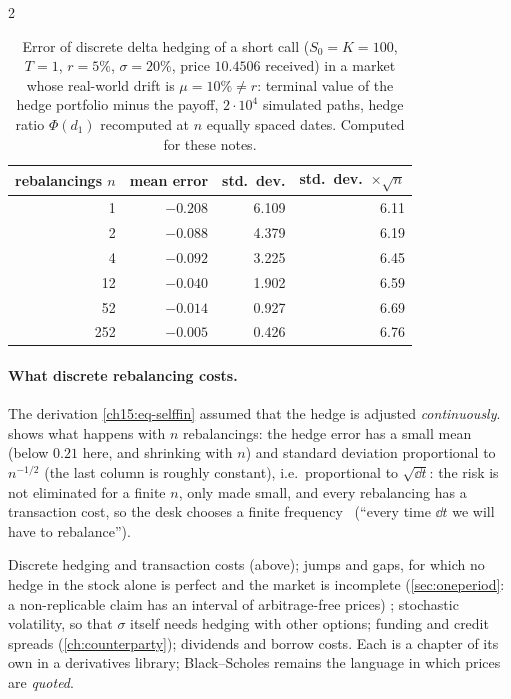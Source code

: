 \begin{paracol}{2}
\begin{table}[ht]
\centering\small
\begin{tabular}{r r r r}
\toprule
rebalancings $n$ & mean error & std.\ dev. & std.\ dev.\ $\times\sqrt n$\\
\midrule
1 & $-0.208$ & 6.109 & 6.11\\
2 & $-0.088$ & 4.379 & 6.19\\
4 & $-0.092$ & 3.225 & 6.45\\
12 & $-0.040$ & 1.902 & 6.59\\
52 & $-0.014$ & 0.927 & 6.69\\
252 & $-0.005$ & 0.426 & 6.76\\
\bottomrule
\end{tabular}
\caption{Error of discrete delta hedging of a short call ($S_0=K=100$, $T=1$, $r=5\%$, $\sigma=20\%$, price $10.4506$ received) in a market whose real-world drift is $\mu=10\%\ne r$:
terminal value of the hedge portfolio minus the payoff, $2\cdot10^4$ simulated paths, hedge ratio $\Phi(d_1)$ recomputed at $n$ equally spaced dates. Computed for these notes.}\label{ch15:tab-hedge}
\end{table}

\paragraph{What discrete rebalancing costs.} The derivation \eqref{ch15:eq-selffin} assumed that the hedge is adjusted \emph{continuously}.  shows what happens with $n$ rebalancings: the hedge error
has a small mean (below $0.21$ here, and shrinking with $n$) and standard deviation proportional to $n^{-1/2}$ (the last column is roughly constant), i.e.\ proportional to $\sqrt{\dd t}$: the risk is
not eliminated for a finite $n$, only made small, and every rebalancing has a transaction cost, so the desk chooses a finite frequency \ (``every time $\dd t$ we will have to rebalance'').

\begin{finance}
Discrete hedging and transaction costs (above); jumps and gaps, for which no hedge in the stock alone is perfect and the market is incomplete (\cref{sec:oneperiod}: a non-replicable claim has an interval of arbitrage-free prices)
; stochastic volatility, so that $\sigma$ itself needs hedging with other options; funding and credit spreads (\cref{ch:counterparty}); dividends and borrow costs. Each is a chapter of its own in a derivatives library;
Black--Scholes remains the language in which prices are \emph{quoted}.
\end{finance}


\end{paracol}
